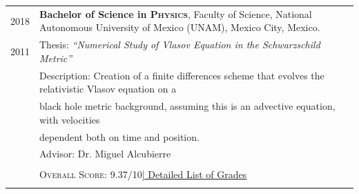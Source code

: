 \documentclass[a4paper,10pt]{article} %
\begin{document}
\begin{tabular}{r|p{14.5cm}}	
	
	
	\textsc{2018} & \textbf{Bachelor of Science in \textsc{\large{Physics}}}, Faculty of Science, National Autonomous University of Mexico (UNAM), \small Mexico City, Mexico.\\
	\textsc{2011} & Thesis: \emph{``Numerical Study of Vlasov Equation in the Schwarzschild Metric''}\\
	&\small Description: Creation of a finite differences scheme that evolves the relativistic Vlasov equation on a\\
	&\hspace{1.7cm} \small black hole metric background, assuming this is an advective equation, with velocities \\
	&\hspace{1.7cm} \small dependent both on time and position.\\
	& \small Advisor: Dr. Miguel Alcubierre\\
	& \\
	&\normalsize \textsc{Overall Score}: 9.37/10\hyperlink{grdsbach}{\hfill | \footnotesize Detailed List of Grades}\\
	\multicolumn{2}{c}{}\\
	
	
\end{tabular}

\end{document}

